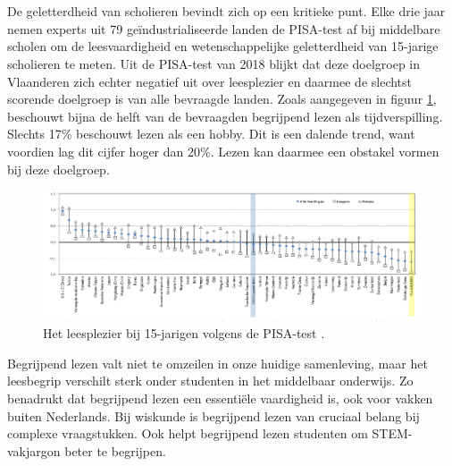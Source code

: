 \section{}%
\label{sec:probleemstelling}

De geletterdheid van scholieren bevindt zich op een kritieke punt. Elke drie jaar nemen experts uit 79 geïndustrialiseerde landen de PISA-test af bij middelbare scholen om de leesvaardigheid en wetenschappelijke geletterdheid van 15-jarige scholieren te meten. Uit de PISA-test van 2018 blijkt dat deze doelgroep in Vlaanderen zich echter negatief uit over leesplezier en daarmee de slechtst scorende doelgroep is van alle bevraagde landen. Zoals aangegeven in figuur \ref{img:oeso-leesplezier}, beschouwt bijna de helft van de bevraagden begrijpend lezen als tijdverspilling. Slechts 17\% beschouwt lezen als een hobby. Dit is een dalende trend, want voordien lag dit cijfer hoger dan 20\%. Lezen kan daarmee een obstakel vormen bij deze doelgroep.

\begin{figure}[H]
	\begin{center}
		\includegraphics[width=\linewidth]{img/oeso-graphic-leesplezier.png}
	\end{center}
	\caption{Het leesplezier bij 15-jarigen volgens de PISA-test \autocite{DeMeyer2019}.}
	\label{img:oeso-leesplezier}
\end{figure}

Begrijpend lezen valt niet te omzeilen in onze huidige samenleving, maar het leesbegrip verschilt sterk onder studenten in het middelbaar onderwijs. Zo benadrukt \textcite{Vlaanderen2020} dat begrijpend lezen een essentiële vaardigheid is, ook voor vakken buiten Nederlands. Bij wiskunde is begrijpend lezen van cruciaal belang bij complexe vraagstukken. Ook helpt begrijpend lezen studenten om STEM-vakjargon beter te begrijpen.

\medspace 

